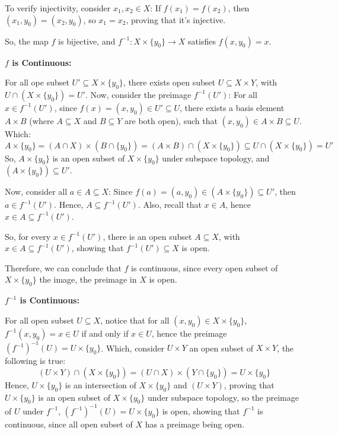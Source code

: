 \documentclass{article}
\begin{document}
To verify injectivity, consider $x_1,x_2 \in X$: If $f(x_1)=f(x_2)$, then $(x_1,y_0)=(x_2,y_0)$, so $x_1=x_2$, proving that it's injective.

So, the map $f$ is bijective, and $f^{-1}:X\times \{y_0\}\rightarrow X$ satisfies $f(x,y_0)=x$.

\hfill

\textbf{$f$ is Continuous:}

For all ope subset $U'\subseteq X\times \{y_0\}$, there exists open subset $U\subseteq X\times Y$, with $U\cap (X\times \{y_0\}) = U'$.
Now, consider the preimage $f^{-1}(U')$: For all $x\in f^{-1}(U')$, since $f(x)=(x,y_0)\in U' \subseteq U$, there exists a basis element $A\times B$ 
(where $A\subseteq X$ and $B\subseteq Y$ are both open), such that $(x,y_0)\in A\times B \subseteq U$.
Which:
$$A\times \{y_0\} = (A\cap X)\times (B\cap \{y_0\}) = (A\times B)\cap (X\times \{y_0\}) \subseteq U\cap (X\times \{y_0\})=U'$$
So, $A\times \{y_0\}$ is an open subset of $X\times \{y_0\}$ under subspace topology, and $(A\times \{y_0\})\subseteq U'$.

Now, consider all $a\in A\subseteq X$: Since $f(a)=(a,y_0)\in (A\times \{y_0\})\subseteq U'$, then $a\in f^{-1}(U')$.
Hence, $A\subseteq f^{-1}(U')$. Also, recall that $x\in A$, hence $x\in A \subseteq f^{-1}(U')$. 

So, for every $x\in f^{-1}(U')$, there is an open subset $A\subseteq X$, with $x\in A\subseteq f^{-1}(U')$, showing that $f^{-1}(U')\subseteq X$ is open.

Therefore, we can conclude that $f$ is continuous, since every open subset of $X\times \{y_0\}$ the image, the preimage in $X$ is open.

\hfill

\textbf{$f^{-1}$ is Continuous:}

For all open subset $U\subseteq X$, notice that for all $(x,y_0)\in X\times \{y_0\}$, $f^{-1}(x,y_0)=x\in U$ if and only if $x\in U$,
hence the preimage $(f^{-1})^{-1}(U) = U\times \{y_0\}$. Which, consider $U\times Y$ an open subset of $X\times Y$, the following is true:
$$(U\times Y)\cap (X\times \{y_0\}) = (U\cap X)\times (Y\cap \{y_0\}) = U\times \{y_0\}$$
Hence, $U\times \{y_0\}$ is an intersection of $X\times \{y_0\}$ and $(U\times Y)$, proving that $U\times \{y_0\}$ is an open subset of $X\times \{y_0\}$ under subspace topology,
so the preimage of $U$ under $f^{-1}$, $(f^{-1})^{-1}(U) = U\times \{y_0\}$ is open, showing that $f^{-1}$ is continuous, since all open subset of $X$ has a preimage being open.
\end{document}
